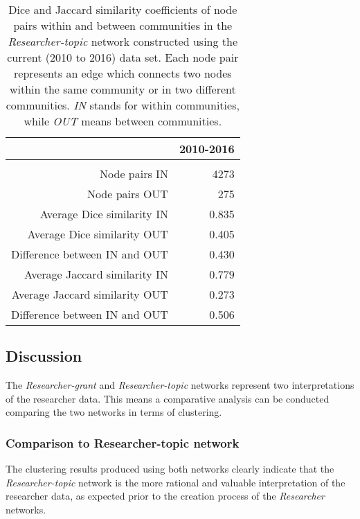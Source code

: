 \begin{table}[htpb]
\centering
\caption[Dice and Jaccard similarity coefficients of node pairs within and between communities in the \textit{Researcher-topic} network constructed using the current (2010 to 2016) data set]{Dice and Jaccard similarity coefficients of node pairs within and between communities in the \textit{Researcher-topic} network constructed using the current (2010 to 2016) data set. Each node pair represents an edge which connects two nodes within the same community or in two different communities. \textit{IN} stands for within communities, while \textit{OUT} means between communities.}
\label{table:researcher_a_evaluation}
\begin{tabular}{r|r}
{} & \textbf{2010-2016}\\
\hline\\
Node pairs IN                  & {4273}\\
Node pairs OUT                 & {275}\\
Average Dice similarity IN     & {0.835}\\
Average Dice similarity OUT    & {0.405}\\
Difference between IN and OUT  & {0.430}\\
Average Jaccard similarity IN  & {0.779}\\
Average Jaccard similarity OUT & {0.273}\\
Difference between IN and OUT  & {0.506}\\
\end{tabular}
\end{table}

\subsection{Discussion}

The \textit{Researcher-grant} and \textit{Researcher-topic} networks represent two interpretations of the researcher data. This means a comparative analysis can be conducted comparing the two networks in terms of clustering.

\subsubsection{Comparison to Researcher-topic network}

The clustering results produced using both networks clearly indicate that the \textit{Researcher-topic}  network is the more rational and valuable interpretation of the researcher data, as expected prior to the creation process of the \textit{Researcher} networks.

